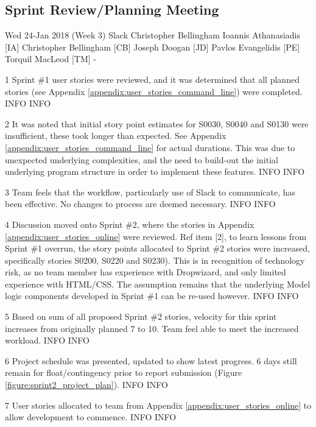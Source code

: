\newpage
\subsection{Sprint Review/Planning Meeting}
\label{appendix:sprint2_planning_meeting}

\momtoptable
{Wed 24-Jan 2018 (Week 3)}
{Slack}
{Christopher Bellingham}
{Ioannis Athanasiadis [IA]\newline
Christopher Bellingham [CB]\newline
Joseph Doogan [JD]\newline
Pavlos Evangelidis [PE]\newline
Torquil MacLeod [TM]}
{-}

\begin{momitems}
	\momitem
	{1}
	{Sprint \#1 user stories were reviewed, and it was determined that all planned stories (see Appendix \ref{appendix:user_stories_command_line}) were completed.}
	{INFO}
	{INFO}

	\momitem
	{2}
	{It was noted that initial story point estimates for S0030, S0040 and S0130 were insufficient, these took longer than expected. 
	See Appendix \ref{appendix:user_stories_command_line} for actual durations. 
	This was due to unexpected underlying complexities, and the need to build-out the initial underlying program structure in order to implement these features.}
	{INFO}
	{INFO}

	\momitem
	{3}
	{Team feels that the workflow, particularly use of Slack to communicate, has been effective. 
	No changes to process are deemed necessary.}
	{INFO}
	{INFO}

	\momitem
	{4}
	{Discussion moved onto Sprint \#2, where the stories in Appendix \ref{appendix:user_stories_online} were reviewed.
	Ref item [2], to learn lessons from Sprint \#1 overrun, the story points allocated to Sprint \#2 stories were increased, specifically stories S0200, S0220 and S0230).
	This is in recognition of technology risk, as no team member has experience with Dropwizard, and only limited experience with HTML/CSS.
	The assumption remains that the underlying Model logic components developed in Sprint \#1 can be re-used however.}
	{INFO}
	{INFO}

	\momitem
	{5}
	{Based on sum of all proposed Sprint \#2 stories, velocity for this sprint increases from originally planned 7 to 10.
	Team feel able to meet the increased workload.}
	{INFO}
	{INFO}

	\momitem
	{6}
	{Project schedule was presented, updated to show latest progress. 6 days still remain for float/contingency prior to report submission (Figure \ref{figure:sprint2_project_plan}).}
	{INFO}
	{INFO}

	\momitem
	{7}
	{User stories allocated to team from Appendix \ref{appendix:user_stories_online} to allow development to commence.}
	{INFO}
	{INFO}
\end{momitems}


